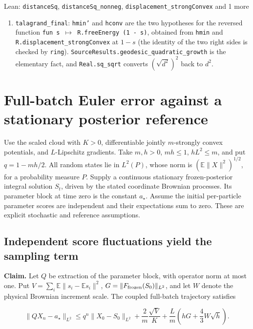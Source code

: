 \documentclass[11pt,a4paper]{report}
\begin{document}
\begin{leanbox}{Lean: \texttt{distanceSq}, \texttt{distanceSq\_\allowbreak{}nonneg}, \texttt{displacement\_\allowbreak{}strongConvex} and 1 more}
\begin{enumerate}
\item \texttt{talagrand\_\allowbreak{}final}: \texttt{hmin'} and \texttt{hconv} are the two hypotheses for the reversed function \texttt{fun s \ensuremath{\mapsto} R.\allowbreak{}free\allowbreak{}Energy (1 -\allowbreak{} s)}, obtained from \texttt{hmin} and \texttt{R.\allowbreak{}displacement\_\allowbreak{}strong\allowbreak{}Convex} at \(1-s\) (the identity of the two right sides is checked by \texttt{ring}). \texttt{Source\allowbreak{}Results.\allowbreak{}geodesic\_\allowbreak{}quadratic\_\allowbreak{}growth} is the elementary fact, and \texttt{Real.\allowbreak{}sq\_\allowbreak{}sqrt} converts \((\sqrt{d^2})^2\) back to \(d^2\).

\end{enumerate}
\end{leanbox}
\section{\texorpdfstring{Full-batch Euler error against a stationary posterior reference}{Full-batch Euler error against a stationary posterior reference}}


Use the scaled cloud with \(K>0\), differentiable jointly \(m\)-strongly convex potentials, and \(L\)-Lipschitz gradients. Take \(m,h>0\), \(mh\le1\), \(hL^2\le m\), and put \(q=1-mh/2\). All random states lie in \(L^2(P)\), whose norm is \((\mathbb E\|X\|^2)^{1/2}\), for a probability measure \(P\). Supply a continuous stationary frozen-posterior integral solution \(S_t\), driven by the stated coordinate Brownian processes. Its parameter block at time zero is the constant \(a_\star\). Assume the initial per-particle parameter scores are independent and their expectations sum to zero. These are explicit stochastic and reference assumptions.

\subsection{\texorpdfstring{Independent score fluctuations yield the sampling term}{Independent score fluctuations yield the sampling term}}


\textbf{Claim.} Let \(Q\) be extraction of the parameter block, with operator norm at most one. Put \(V=\sum_i\mathbb E\|s_i-\mathbb Es_i\|^2\), \(G=\|F_{\rm frozen}(S_0)\|_{L^2}\), and let \(W\) denote the physical Brownian increment scale. The coupled full-batch trajectory satisfies

\[\|QX_n-a_\star\|_{L^2}\le q^n\|X_0-S_0\|_{L^2}+\frac2m\frac{\sqrt V}{K}+\frac Lm\left(hG+\frac43W\sqrt h\right).\]
\end{document}
